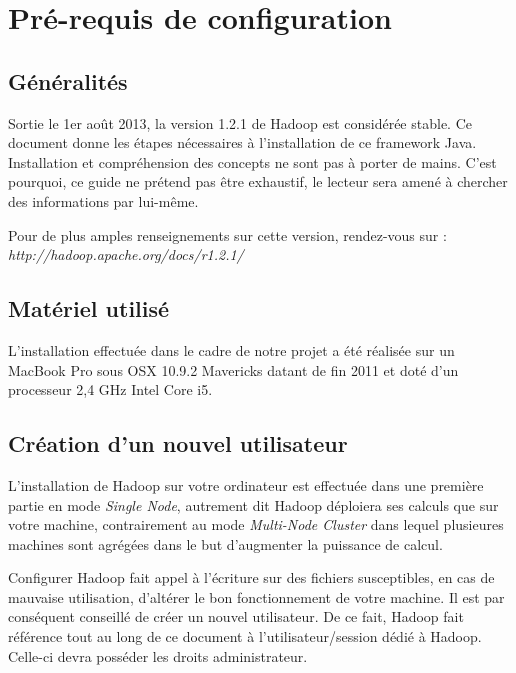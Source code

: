 \section{Pré-requis de configuration}

\subsection{Généralités}

\par Sortie le 1er août 2013, la version 1.2.1 de Hadoop est considérée stable. Ce document donne les étapes nécessaires à l'installation de ce framework Java. Installation et compréhension des concepts ne sont pas à porter de mains. C’est pourquoi, ce guide ne prétend pas être exhaustif, le lecteur sera amené à chercher des informations par lui-même.

\par Pour de plus amples renseignements sur cette version, rendez-vous sur :
\textit{http://hadoop.apache.org/docs/r1.2.1/}

\subsection{Matériel utilisé}

\par L'installation effectuée dans le cadre de notre projet a été réalisée sur un MacBook Pro sous OSX 10.9.2 Mavericks datant de fin 2011 et doté d'un processeur 2,4 GHz Intel Core i5.

\subsection{Création d'un nouvel utilisateur}

\par L'installation de Hadoop sur votre ordinateur est effectuée dans une première partie en mode \textit{Single Node}, autrement dit Hadoop déploiera ses calculs que sur votre machine, contrairement au mode \textit{Multi-Node Cluster} dans lequel plusieures machines sont agrégées dans le but d'augmenter la puissance de calcul.

\par Configurer Hadoop fait appel à l'écriture sur des fichiers susceptibles, en cas de mauvaise utilisation, d'altérer le bon fonctionnement de votre machine. Il est par conséquent conseillé de créer un nouvel utilisateur. De ce fait, Hadoop fait référence tout au long de ce document à l'utilisateur/session dédié à Hadoop. Celle-ci devra posséder les droits administrateur.

